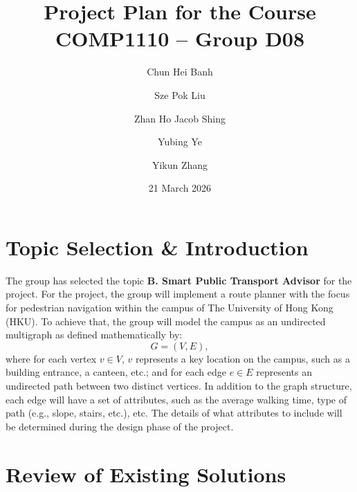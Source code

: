 \documentclass[a4paper,12pt]{amsart}
\begin{document}
\title[Project Plan]{Project Plan for the Course COMP1110 -- Group D08}
\newcommand{\cBanh}{C. Banh}
\author[\cBanh]{Chun Hei Banh}
\address{\cBanh, BEng(Elite/AI\&DataSc), 3036570233, \href{mailto:kbch@connect.hku.hk}{\texttt{kbch@connect.hku.hk}}}
%
\newcommand{\sLiu}{S. Liu}
\author[\sLiu]{Sze Pok Liu}
\address{\sLiu, BEng(AI\&DataSc), 3036589454, \href{mailto:u3658945@connect.hku.hk}{\texttt{u3658945@connect.hku.hk}}}
%
\newcommand{\jShing}{J. Shing}
\author[\jShing]{Zhan Ho Jacob Shing}
\address{\jShing, BEng(CompSc), 3036228892, \href{mailto:jacobszh@connect.hku.hk}{\texttt{jacobszh@connect.hku.hk}}}
%
\newcommand{\yYe}{Y. Ye}
\author[\yYe]{Yubing Ye}
\address{\yYe, BEng(CompSc), 3036291502, \href{mailto:u3629150@connect.hku.hk}{\texttt{u3629150@connect.hku.hk}}}
%
\newcommand{\yZhang}{Y. Zhang}
\author[\yZhang]{Yikun Zhang}
\address{\yZhang, BEng(CompSc), 3036482333, \href{mailto:pzdmmsd@connect.hku.hk}{\texttt{pzdmmsd@connect.hku.hk}}}
\date{21 March 2026}
\maketitle


\section{Topic Selection \& Introduction}

The group has selected the topic \textbf{B. Smart Public Transport Advisor} for the project.
For the project, the group will implement a route planner with the focus for pedestrian navigation within the campus of The University of Hong Kong (HKU).
To achieve that, the group will model the campus as an undirected multigraph as defined mathematically by:
\begin{equation} \label{eq:graph}
    G=(V,E),
\end{equation}
where for each vertex $v \in V$, $v$ represents a key location on the campus, such as a building entrance, a canteen, etc.;
and for each edge $e \in E$ represents an undirected path between two distinct vertices.
In addition to the graph structure, each edge will have a set of attributes, such as the average walking time, type of path (e.g., slope, stairs, etc.), etc.
The details of what attributes to include will be determined during the design phase of the project.

\section{Review of Existing Solutions}
\end{document}
